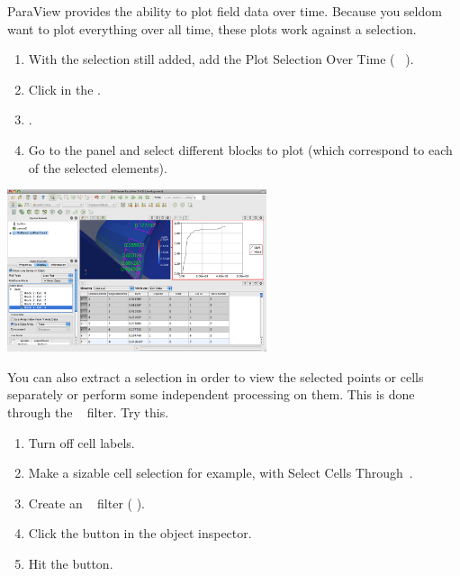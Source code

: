 ParaView provides the ability to plot field data over time.  Because you
seldom want to plot everything over all time, these plots work against a
selection.

\begin{enumerate}
\item With the selection still added, add the Plot Selection Over Time
  ( \ra {} \ra {}~). 
\item Click  in the .
\item \apply.
\item Go to the  panel and select different blocks to plot
  (which correspond to each of the selected elements).
\end{enumerate}

\begin{inlinefig}
  \includegraphics[width=3in]{images/PlotSelectionOverTime}
\end{inlinefig}

You can also extract a selection in order to view the selected points or
cells separately or perform some independent processing on them.  This is
done through the ~
filter.  Try this.

\begin{enumerate}
\item Turn off cell labels.
\item Make a sizable cell selection for example, with Select Cells
  Through~\selectCellsThrough.
\item Create an ~ filter
  ( \ra {} \ra {}).
\item Click the  button in the object inspector.
\item Hit the \apply button.
\end{enumerate}

